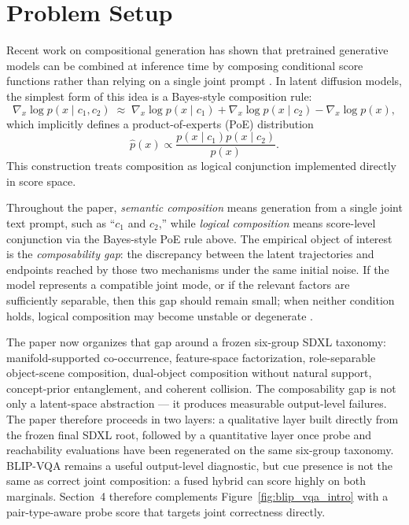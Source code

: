 \documentclass{article}
\begin{document}
\section{Problem Setup}

Recent work on compositional generation has shown that pretrained generative models can be combined at inference time by composing conditional score functions rather than relying on a single joint prompt \citep{NEURIPS2020_49856ed4,du2024compositional,liu2022compositional}. In latent diffusion models, the simplest form of this idea is a Bayes-style composition rule:
\begin{equation}
\nabla_x \log p(x \mid c_1, c_2)
\;\approx\;
\nabla_x \log p(x \mid c_1)
+
\nabla_x \log p(x \mid c_2)
-
\nabla_x \log p(x),
\end{equation}
which implicitly defines a product-of-experts (PoE) distribution
\begin{equation}
\hat p(x) \propto \frac{p(x \mid c_1)p(x \mid c_2)}{p(x)}.
\end{equation}
This construction treats composition as logical conjunction implemented directly in score space.

Throughout the paper, \emph{semantic composition} means generation from a single joint text prompt, such as ``$c_1$ and $c_2$,'' while \emph{logical composition} means score-level conjunction via the Bayes-style PoE rule above. The empirical object of interest is the \emph{composability gap}: the discrepancy between the latent trajectories and endpoints reached by those two mechanisms under the same initial noise. If the model represents a compatible joint mode, or if the relevant factors are sufficiently separable, then this gap should remain small; when neither condition holds, logical composition may become unstable or degenerate \citep{mechanisms2025projective}.

The paper now organizes that gap around a frozen six-group SDXL taxonomy: manifold-supported co-occurrence, feature-space factorization, role-separable object-scene composition, dual-object composition without natural support, concept-prior entanglement, and coherent collision. The composability gap is not only a latent-space abstraction --- it produces measurable output-level failures. The paper therefore proceeds in two layers: a qualitative layer built directly from the frozen final SDXL root, followed by a quantitative layer once probe and reachability evaluations have been regenerated on the same six-group taxonomy. BLIP-VQA \citep{li2022blip} remains a useful output-level diagnostic, but cue presence is not the same as correct joint composition: a fused hybrid can score highly on both marginals. Section~4 therefore complements Figure~\ref{fig:blip_vqa_intro} with a pair-type-aware probe score that targets joint correctness directly.
\end{document}
